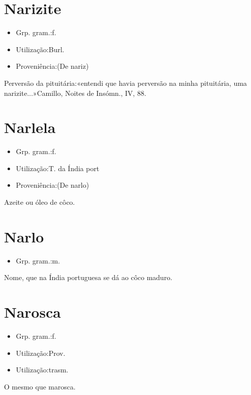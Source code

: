 \section{Narizite}
\begin{itemize}
\item {Grp. gram.:f.}
\end{itemize}
\begin{itemize}
\item {Utilização:Burl.}
\end{itemize}
\begin{itemize}
\item {Proveniência:(De \textunderscore nariz\textunderscore )}
\end{itemize}
Perversão da pituitária:«\textunderscore entendi que havia perversão na minha pituitária, uma narizite...\textunderscore »Camillo, \textunderscore Noites de Insómn.\textunderscore , IV, 88.
\section{Narlela}
\begin{itemize}
\item {Grp. gram.:f.}
\end{itemize}
\begin{itemize}
\item {Utilização:T. da Índia port}
\end{itemize}
\begin{itemize}
\item {Proveniência:(De \textunderscore narlo\textunderscore )}
\end{itemize}
Azeite ou óleo de côco.
\section{Narlo}
\begin{itemize}
\item {Grp. gram.:m.}
\end{itemize}
Nome, que na Índia portuguesa se dá ao côco maduro.
\section{Narosca}
\begin{itemize}
\item {Grp. gram.:f.}
\end{itemize}
\begin{itemize}
\item {Utilização:Prov.}
\end{itemize}
\begin{itemize}
\item {Utilização:trasm.}
\end{itemize}
O mesmo que \textunderscore marosca\textunderscore .
